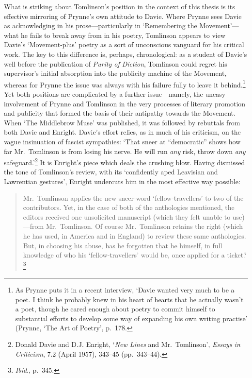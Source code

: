 \documentclass[]{article}
\begin{document}
What is striking about Tomlinson's position in the context of this
thesis is its effective mirroring of Prynne's own attitude to Davie.
Where Prynne sees Davie as acknowledging in his prose---particularly in
`Remembering the Movement'---what he fails to break away from in his
poetry, Tomlinson appears to view Davie's `Movement-plus' poetry as a
sort of unconscious vanguard for his critical work. The key to this
difference is, perhaps, chronological: as a student of Davie's well
before the publication of \emph{Purity of Diction}, Tomlinson could
regret his supervisor's initial absorption into the publicity machine of
the Movement, whereas for Prynne the issue was always with his failure
fully to leave it behind.\footnote{As Prynne puts it in a recent
  interview, `Davie wanted very much to be a poet. I think he probably
  knew in his heart of hearts that he actually wasn't a poet, though he
  cared enough about poetry to commit himself to substantial efforts to
  develop some way of expanding his own writing practise' (Prynne, `The
  Art of Poetry', p.~178.} Yet both positions are complicated by a
further issue---namely, the uneasy involvement of Prynne and Tomlinson
in the very processes of literary promotion and publicity that formed
the basis of their antipathy towards the Movement. When `The Middlebrow
Muse' was published, it was followed by rebuttals from both Davie and
Enright. Davie's effort relies, as in much of his criticism, on the
vague insinuation of fascist sympathies: `That sneer at ``democratic''
shows how far Mr.~Tomlinson is from losing his nerve. He will run
\emph{any} risk, throw down \emph{any} safeguard.'\footnote{Donald Davie
  and D.J. Enright, `\emph{New Lines} and Mr.~Tomlinson', \emph{Essays
  in Criticism}, 7.2 (April 1957), 343--45 (pp.~343--44).} It is
Enright's piece which deals the crushing blow. Having dismissed the tone
of Tomlinson's review, with its `confidently aped Leavisian and
Lawrentian gestures', Enright undercuts him in the most effective way
possible:

\begin{quote}
Mr.~Tomlinson applies the new sneer-word `fellow-travellers' to two of
the contributors. Yet, in the case of both of the anthologies mentioned,
the editors received one unsolicited manuscript (which they felt unable
to use)---from Mr.~Tomlinson. Of course Mr.~Tomlinson retains the right
(which he has used, in America and in England) to review these same
anthologies. But, in choosing his abuse, has he forgotten that he
himself, in full knowledge of who his `fellow-travellers' would be, once
applied for a ticket?\footnote{\emph{Ibid}., p.~345.}
\end{quote}
\end{document}
